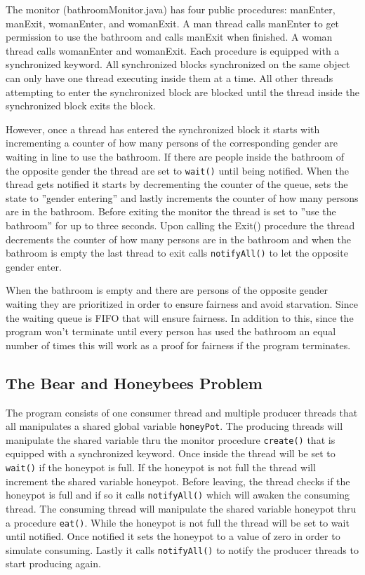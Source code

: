 \documentclass{article}
\begin{document}
The monitor (bathroomMonitor.java) has four public procedures: manEnter, manExit, womanEnter, and womanExit. A man thread calls manEnter to get permission to use the bathroom and calls manExit when finished. A woman thread calls womanEnter and womanExit. Each procedure is equipped with a synchronized keyword. All synchronized blocks synchronized on the same object can only have one thread executing inside them at a time. All other threads attempting to enter the synchronized block are blocked until the thread inside the synchronized block exits the block. 

However, once a thread has entered the synchronized block it starts with incrementing a counter of how many persons of the corresponding gender are waiting in line to use the bathroom. If there are people inside the bathroom of the opposite gender the thread are set to \texttt{wait()} until being notified. When the thread gets notified it starts by decrementing the counter of the queue, sets the state to ”gender entering” and lastly increments the counter of how many persons are in the bathroom. Before exiting the monitor the thread is set to ”use the bathroom” for up to three seconds. Upon calling the Exit() procedure the thread decrements the counter of how many persons are in the bathroom and when the bathroom is empty the last thread to exit calls \texttt{notifyAll()} to let the opposite gender enter. 

When the bathroom is empty and there are persons of the opposite gender waiting they are prioritized in order to ensure fairness and avoid starvation. Since the waiting queue is FIFO that will ensure fairness. In addition to this, since the program won’t terminate until every person has used the bathroom an equal number of times this will work as a proof for fairness if the program terminates.

\subsection{The Bear and Honeybees Problem}

The program consists of one consumer thread and multiple producer threads that all manipulates a shared global variable \texttt{honeyPot}. The producing threads will manipulate the shared variable thru the monitor procedure \texttt{create()} that is equipped with a synchronized keyword. Once inside the thread will be set to \texttt{wait()} if the honeypot is full. If the honeypot is not full the thread will increment the shared variable honeypot. Before leaving, the thread checks if the honeypot is full and if so it calls \texttt{notifyAll()} which will awaken the consuming thread. 
The consuming thread will manipulate the shared variable honeypot thru a procedure \texttt{eat()}. While the honeypot is not full the thread will be set to wait until notified. Once notified it sets the honeypot to a value of zero in order to simulate consuming. Lastly it calls \texttt{notifyAll()} to notify the producer threads to start producing again. 
\end{document}
